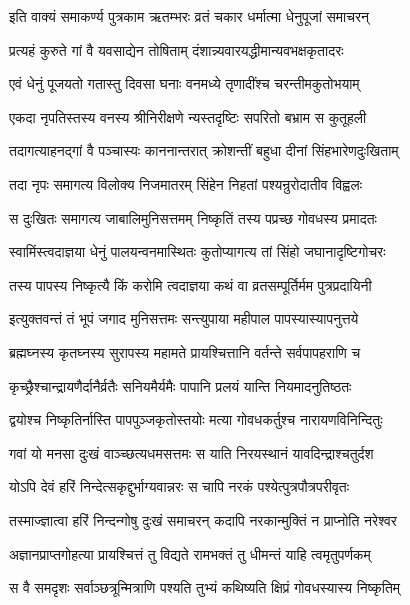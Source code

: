 \twolineshloka
{इति वाक्यं समाकर्ण्य पुत्रकाम ऋतम्भरः}
{व्रतं चकार धर्मात्मा धेनुपूजां समाचरन्}%

\twolineshloka
{प्रत्यहं कुरुते गां वै यवसाद्येन तोषिताम्}
{दंशान्न्यवारयद्धीमान्यवभक्षकृतादरः}%

\twolineshloka
{एवं धेनुं पूजयतो गतास्तु दिवसा घनाः}
{वनमध्ये तृणादींश्च चरन्तीमकुतोभयाम्}%

\twolineshloka
{एकदा नृपतिस्तस्य वनस्य श्रीनिरीक्षणे}
{न्यस्तदृष्टिः सपरितो बभ्राम स कुतूहली}%

\twolineshloka
{तदागत्याहनद्गां वै पञ्चास्यः काननान्तरात्}
{क्रोशन्तीं बहुधा दीनां सिंहभारेणदुःखिताम्}%

\twolineshloka
{तदा नृपः समागत्य विलोक्य निजमातरम्}
{सिंहेन निहतां पश्यन्रुरोदातीव विह्वलः}%

\twolineshloka
{स दुःखितः समागत्य जाबालिमुनिसत्तमम्}
{निष्कृतिं तस्य पप्रच्छ गोवधस्य प्रमादतः}%


\twolineshloka
{स्वामिंस्त्वदाज्ञया धेनुं पालयन्वनमास्थितः}
{कुतोप्यागत्य तां सिंहो जघानादृष्टिगोचरः}%

\twolineshloka
{तस्य पापस्य निष्कृत्यै किं करोमि त्वदाज्ञया}
{कथं वा व्रतसम्पूर्तिर्मम पुत्रप्रदायिनी}%

\twolineshloka
{इत्युक्तवन्तं तं भूपं जगाद मुनिसत्तमः}
{सन्त्युपाया महीपाल पापस्यास्यापनुत्तये}%

\twolineshloka
{ब्रह्मघ्नस्य कृतघ्नस्य सुरापस्य महामते}
{प्रायश्चित्तानि वर्तन्ते सर्वपापहराणि च}%

\twolineshloka
{कृच्छ्रैश्चान्द्रायणैर्दानैर्व्रतैः सनियमैर्यमैः}
{पापानि प्रलयं यान्ति नियमादनुतिष्ठतः}%

\twolineshloka
{द्वयोश्च निष्कृतिर्नास्ति पापपुञ्जकृतोस्तयोः}
{मत्या गोवधकर्तुश्च नारायणविनिन्दितुः}%

\twolineshloka
{गवां यो मनसा दुःखं वाञ्च्छत्यधमसत्तमः}
{स याति निरयस्थानं यावदिन्द्राश्चतुर्दश}%

\twolineshloka
{योऽपि देवं हरिं निन्देत्सकृद्दुर्भाग्यवान्नरः}
{स चापि नरकं पश्येत्पुत्रपौत्रपरीवृतः}%

\twolineshloka
{तस्माज्ज्ञात्वा हरिं निन्दन्गोषु दुःखं समाचरन्}
{कदापि नरकान्मुक्तिं न प्राप्नोति नरेश्वर}%

\twolineshloka
{अज्ञानप्राप्तगोहत्या प्रायश्चित्तं तु विद्यते}
{रामभक्तं तु धीमन्तं याहि त्वमृतुपर्णकम्}%

\twolineshloka
{स वै समदृशः सर्वाञ्छत्रून्मित्राणि पश्यति}
{तुभ्यं कथिष्यति क्षिप्रं गोवधस्यास्य निष्कृतिम्}%

